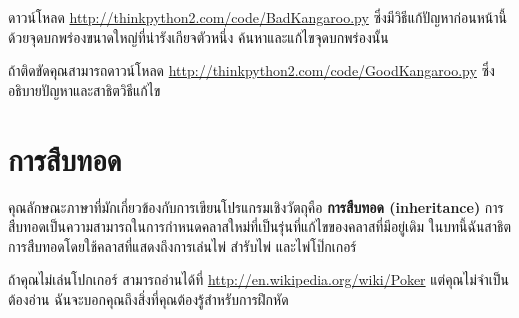 \begin{exercise}

ดาวน์โหลด \url{http://thinkpython2.com/code/BadKangaroo.py} 
ซึ่งมีวิธีแก้ปัญหาก่อนหน้านี้ด้วยจุดบกพร่องขนาดใหญ่ที่น่ารังเกียจตัวหนึ่ง ค้นหาและแก้ไขจุดบกพร่องนั้น



ถ้าติดขัดคุณสามารถดาวน์โหลด \url{http://thinkpython2.com/code/GoodKangaroo.py} ซึ่งอธิบายปัญหาและสาธิตวิธีแก้ไข


\end{exercise}



\chapter{การสืบทอด} %


คุณลักษณะภาษาที่มักเกี่ยวข้องกับการเขียนโปรแกรมเชิงวัตถุคือ {\bf การสืบทอด (inheritance)} การสืบทอดเป็นความสามารถในการกำหนดคลาสใหม่ที่เป็นรุ่นที่แก้ไขของคลาสที่มีอยู่เดิม
ในบทนี้ฉันสาธิตการสืบทอดโดยใช้คลาสที่แสดงถึงการเล่นไพ่ สำรับไพ่ และไพ่โป๊กเกอร์


ถ้าคุณไม่เล่นโปกเกอร์ สามารถอ่านได้ที่ \url{http://en.wikipedia.org/wiki/Poker} แต่คุณไม่จำเป็นต้องอ่าน ฉันจะบอกคุณถึงสิ่งที่คุณต้องรู้สำหรับการฝึกหัด



